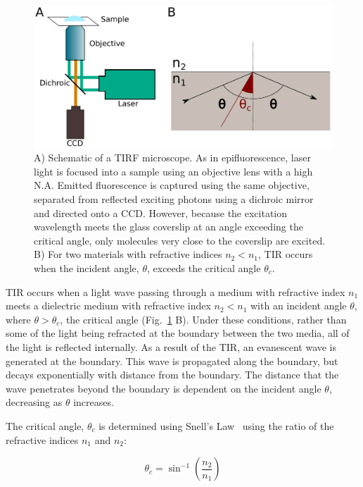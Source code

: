 \begin{figure}
	\begin{center}
	\includegraphics*[clip=true, width=6in]{introduction/tirf.pdf}
	\caption{A) Schematic of a TIRF microscope. As in epifluorescence, laser light is focused into a sample using an objective lens with a high N.A. Emitted fluorescence is captured using the same objective, separated from reflected exciting photons using a dichroic mirror and directed onto a CCD. However, because the excitation wavelength meets the glass coverslip at an angle exceeding the critical angle, only molecules very close to the coverslip are excited. B) For two materials with refractive indices $n_2 < n_1$, TIR occurs when the incident angle, $\theta$, exceeds the critical angle $\theta_c$.}
	\label{fig:TIRF}
	\end{center}
\end{figure}

TIR occurs when a light wave passing through a medium with refractive index $n_1$ meets a dielectric medium with refractive index $n_2 < n_1$ with an incident angle $\theta$, where $\theta > \theta_c$, the critical angle (Fig.~\ref{fig:TIRF} B). Under these conditions, rather than some of the light being refracted at the boundary between the two media, all of the light is reflected internally. As a result of the TIR, an evanescent wave is generated at the boundary. This wave is propagated along the boundary, but decays exponentially with distance from the boundary. The distance that the wave penetrates beyond the boundary is dependent on the incident angle $\theta$, decreasing as $\theta$ increases. 

The critical angle, $\theta_c$ is determined using Snell's Law~\cite{Wolf1995} using the ratio of the refractive indices $n_1$ and $n_2$:

\begin{equation}
\theta_c = \sin^{-1}\left(\frac{n_2}{n_1}\right)
\label{eq:snell}
\end{equation}

